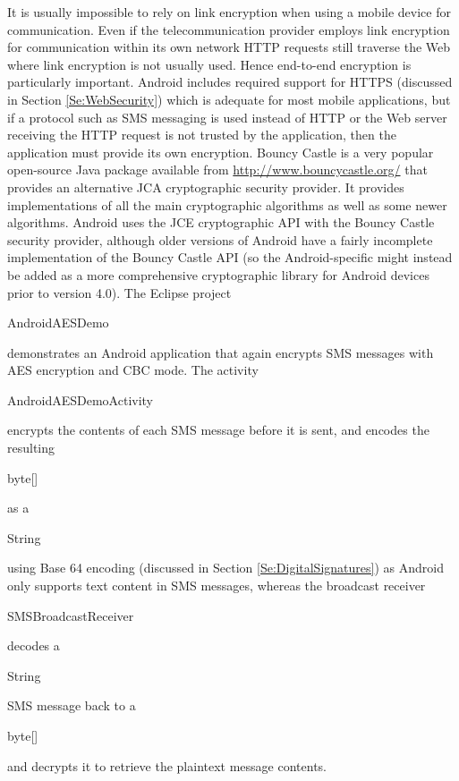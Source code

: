 It is usually impossible to rely on link encryption when using a mobile device
for communication. Even if the telecommunication provider employs link encryption
for communication within its own network HTTP requests still traverse the Web
where link encryption is not usually used. Hence end-to-end encryption is
particularly important. Android includes required support for HTTPS
(discussed in Section \ref{Se:WebSecurity}) which is adequate for most
mobile applications, but if a protocol such as SMS messaging is used instead of
HTTP or the Web server receiving the HTTP request is not trusted by the application,
then the application must provide its own encryption. Bouncy Castle is a very popular
open-source Java package available from \url{http://www.bouncycastle.org/}
that provides an alternative JCA cryptographic security provider.
It provides implementations of all the main cryptographic algorithms
as well as some newer algorithms. Android uses the JCE cryptographic API with the Bouncy Castle security provider,
although older versions of Android have a fairly incomplete implementation of the
Bouncy Castle API
(so the Android-specific  might instead be
added as a more comprehensive cryptographic library for Android devices prior to version 4.0).
The Eclipse project \begin{code}AndroidAESDemo\end{code} demonstrates an Android
application that again encrypts SMS messages with AES encryption and CBC mode.
The activity \begin{code}AndroidAESDemo\-Activity\end{code} encrypts the contents of
each SMS message before it is sent, and encodes the resulting \begin{code}byte[]\end{code}
as a \begin{code}String\end{code} using Base 64 encoding
(discussed in Section \ref{Se:DigitalSignatures}) as Android only supports text content
in SMS messages,
whereas the broadcast receiver \begin{code}SMSBroadcastReceiver\end{code}
decodes a \begin{code}String\end{code} SMS message back to a \begin{code}byte[]\end{code}
and decrypts it to retrieve the plaintext message contents.
